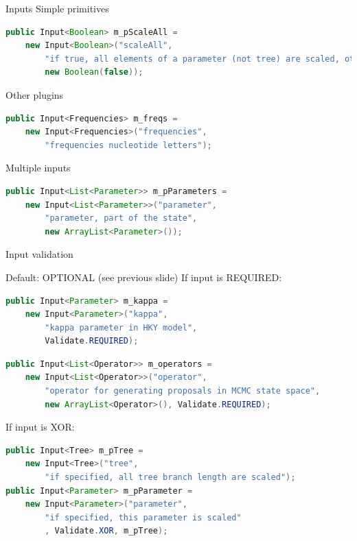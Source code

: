 \documentclass{beamer}
\theoremstyle{definition}
\begin{document}
\begin{frame}[containsverbatim]
{\Large Inputs}
Simple primitives

\begin{lstlisting}[language=java]
public Input<Boolean> m_pScaleAll = 
    new Input<Boolean>("scaleAll", 
        "if true, all elements of a parameter (not tree) are scaled, otherwise one is randomly selected",
        new Boolean(false));
\end{lstlisting}

Other plugins

\begin{lstlisting}[language=java]
public Input<Frequencies> m_freqs = 
    new Input<Frequencies>("frequencies", 
        "frequencies nucleotide letters");
\end{lstlisting}

Multiple inputs

\begin{lstlisting}[language=java]
public Input<List<Parameter>> m_pParameters = 
    new Input<List<Parameter>>("parameter", 
        "parameter, part of the state",
        new ArrayList<Parameter>());
\end{lstlisting}
\end{frame}

\begin{frame}[containsverbatim]
{\Large Input validation}

Default: OPTIONAL (see previous slide)
\vskip0.2cm
If input is REQUIRED:

\begin{lstlisting}[language=java]
public Input<Parameter> m_kappa = 
    new Input<Parameter>("kappa", 
        "kappa parameter in HKY model",
        Validate.REQUIRED);
\end{lstlisting}

\begin{lstlisting}[language=java]
public Input<List<Operator>> m_operators = 
    new Input<List<Operator>>("operator",
        "operator for generating proposals in MCMC state space",
        new ArrayList<Operator>(), Validate.REQUIRED);
\end{lstlisting}

If input is XOR:

\begin{lstlisting}[language=java]
public Input<Tree> m_pTree = 
    new Input<Tree>("tree", 
        "if specified, all tree branch length are scaled");
public Input<Parameter> m_pParameter = 
    new Input<Parameter>("parameter", 
        "if specified, this parameter is scaled"
        , Validate.XOR, m_pTree);
\end{lstlisting}

\end{frame}
\end{document}
